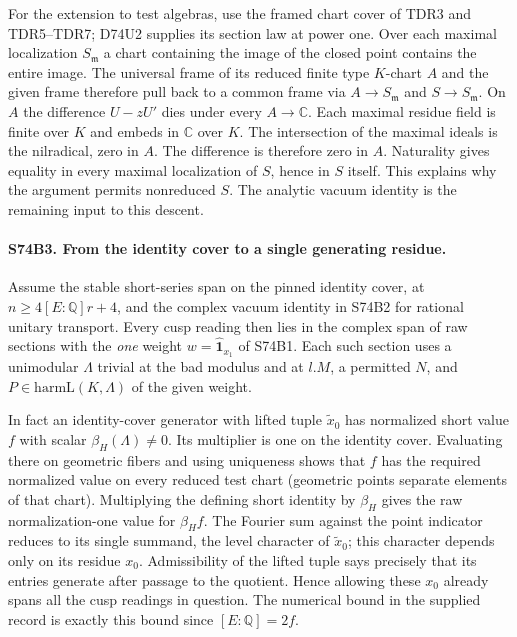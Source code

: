For the extension to test algebras, use the framed chart cover of
TDR3 and TDR5--TDR7; D74U2 supplies its section law at power one.
Over each maximal localization $S_{\mathfrak m}$ a chart containing
the image of the closed point contains the entire image. The universal
frame of its reduced finite type $K$-chart $A$ and the given frame
therefore pull back to a common frame via $A\to S_{\mathfrak m}$
and $S\to S_{\mathfrak m}$.
On $A$ the difference $U-zU'$ dies under every $A\to\mathbb C$.
Each maximal residue field is finite over $K$ and embeds in
$\mathbb C$ over $K$. The intersection of the maximal ideals is the
nilradical, zero in $A$. The difference is therefore zero in $A$.
Naturality gives equality in every maximal localization of $S$, hence
in $S$ itself. This explains why the argument permits nonreduced $S$.
The analytic vacuum identity is the remaining input to this descent.

\paragraph{S74B3. From the identity cover to a single generating residue.}
Assume the stable short-series span on the pinned identity cover, at
$n\ge 4[E:\mathbb Q]r+4$, and the complex vacuum identity in S74B2 for
rational unitary transport. Every cusp reading then lies in the complex span of raw
sections with the \emph{one} weight $w=\widehat{\mathbf1}_{x_1}$ of
S74B1. Each such section uses a unimodular $\Lambda$ trivial at the
bad modulus and at $l.M$, a permitted $N$, and
$P\in\mathrm{harmL}(K,\Lambda)$ of the given weight.

In fact an identity-cover generator with lifted tuple $\tilde x_0$
has normalized short value $f$ with scalar $\beta_H(\Lambda)\ne0$.
Its multiplier is one on the identity cover. Evaluating there on
geometric fibers and using uniqueness shows that $f$ has the required
normalized value on every reduced test chart (geometric points
separate elements of that chart). Multiplying the defining short
identity by $\beta_H$ gives the raw normalization-one value for
$\beta_H f$. The Fourier sum against the point indicator reduces to
its single summand, the level character of $\tilde x_0$; this
character depends only on its residue $x_0$. Admissibility of the
lifted tuple says precisely that its entries generate after passage
to the quotient. Hence allowing these $x_0$ already spans all the
cusp readings in question. The numerical bound in the supplied
record is exactly this bound since $[E:\mathbb Q]=2f$.

